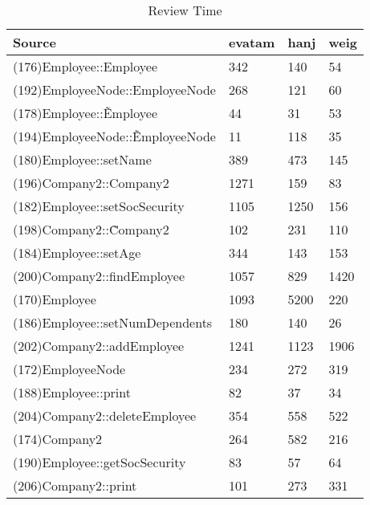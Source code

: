 \begin{table}[hb]
\begin{center}
\begin{tabular}{|l|l|l|l|}
\hline
Source & evatam & hanj & weig\\
\hline
(176)Employee::Employee & 342 & 140 & 54\\
(192)EmployeeNode::EmployeeNode & 268 & 121 & 60\\
(178)Employee::\~Employee & 44 & 31 & 53\\
(194)EmployeeNode::\~EmployeeNode & 11 & 118 & 35\\
(180)Employee::setName & 389 & 473 & 145\\
(196)Company2::Company2 & 1271 & 159 & 83\\
(182)Employee::setSocSecurity & 1105 & 1250 & 156\\
(198)Company2::\~Company2 & 102 & 231 & 110\\
(184)Employee::setAge & 344 & 143 & 153\\
(200)Company2::findEmployee & 1057 & 829 & 1420\\
(170)Employee & 1093 & 5200 & 220\\
(186)Employee::setNumDependents & 180 & 140 & 26\\
(202)Company2::addEmployee & 1241 & 1123 & 1906\\
(172)EmployeeNode & 234 & 272 & 319\\
(188)Employee::print & 82 & 37 & 34\\
(204)Company2::deleteEmployee & 354 & 558 & 522\\
(174)Company2 & 264 & 582 & 216\\
(190)Employee::getSocSecurity & 83 & 57 & 64\\
(206)Company2::print & 101 & 273 & 331\\
\hline
\end{tabular}
\end{center}
\caption{Review Time}
\end{table}


